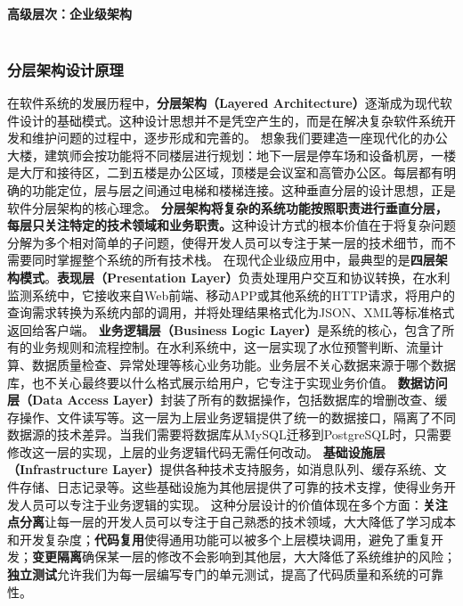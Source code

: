 \paragraph{高级层次：企业级架构}\label{ux9ad8ux7ea7ux5c42ux6b21ux4f01ux4e1aux7ea7ux67b6ux6784} \begin{lstlisting}[language=Java]
\end{lstlisting} \subsubsection{分层架构设计原理}\label{ux5206ux5c42ux67b6ux6784ux8bbeux8ba1ux539fux7406}
在软件系统的发展历程中，\textbf{分层架构（Layered Architecture）}逐渐成为现代软件设计的基础模式。这种设计思想并不是凭空产生的，而是在解决复杂软件系统开发和维护问题的过程中，逐步形成和完善的。
想象我们要建造一座现代化的办公大楼，建筑师会按功能将不同楼层进行规划：地下一层是停车场和设备机房，一楼是大厅和接待区，二到五楼是办公区域，顶楼是会议室和高管办公区。每层都有明确的功能定位，层与层之间通过电梯和楼梯连接。这种垂直分层的设计思想，正是软件分层架构的核心理念。
\textbf{分层架构将复杂的系统功能按照职责进行垂直分层，每层只关注特定的技术领域和业务职责。}这种设计方式的根本价值在于将复杂问题分解为多个相对简单的子问题，使得开发人员可以专注于某一层的技术细节，而不需要同时掌握整个系统的所有技术栈。
在现代企业级应用中，最典型的是\textbf{四层架构模式}。\textbf{表现层（Presentation
Layer）}负责处理用户交互和协议转换，在水利监测系统中，它接收来自Web前端、移动APP或其他系统的HTTP请求，将用户的查询需求转换为系统内部的调用，并将处理结果格式化为JSON、XML等标准格式返回给客户端。
\textbf{业务逻辑层（Business Logic
Layer）}是系统的核心，包含了所有的业务规则和流程控制。在水利系统中，这一层实现了水位预警判断、流量计算、数据质量检查、异常处理等核心业务功能。业务层不关心数据来源于哪个数据库，也不关心最终要以什么格式展示给用户，它专注于实现业务价值。
\textbf{数据访问层（Data Access
Layer）}封装了所有的数据操作，包括数据库的增删改查、缓存操作、文件读写等。这一层为上层业务逻辑提供了统一的数据接口，隔离了不同数据源的技术差异。当我们需要将数据库从MySQL迁移到PostgreSQL时，只需要修改这一层的实现，上层的业务逻辑代码无需任何改动。
\textbf{基础设施层（Infrastructure Layer）}提供各种技术支持服务，如消息队列、缓存系统、文件存储、日志记录等。这些基础设施为其他层提供了可靠的技术支撑，使得业务开发人员可以专注于业务逻辑的实现。
这种分层设计的价值体现在多个方面：\textbf{关注点分离}让每一层的开发人员可以专注于自己熟悉的技术领域，大大降低了学习成本和开发复杂度；\textbf{代码复用}使得通用功能可以被多个上层模块调用，避免了重复开发；\textbf{变更隔离}确保某一层的修改不会影响到其他层，大大降低了系统维护的风险；\textbf{独立测试}允许我们为每一层编写专门的单元测试，提高了代码质量和系统的可靠性。
